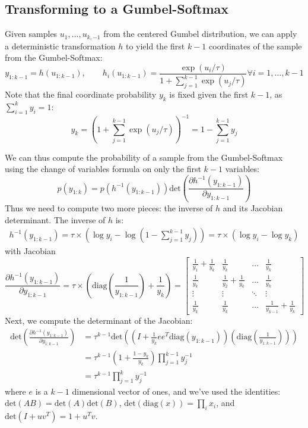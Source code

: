 \documentclass{article} %
\begin{document}
\subsection{Transforming to a Gumbel-Softmax}
Given samples $u_1, ..., u_{k, -1}$ from the centered Gumbel distribution, we can apply a deterministic transformation $h$ to yield the first $k-1$ coordinates of the sample from the Gumbel-Softmax:
\begin{equation}
y_{1:k-1} = h(u_{1:k-1}), \qquad h_i(u_{1:k-1}) = \frac{\exp(u_i / \tau)}{1 + \sum_{j=1}^{k-1} \exp(u_j / \tau)} \forall i=1,\dots,{k-1}
\end{equation}
Note that the final coordinate probability $y_k$ is fixed given the first $k-1$, as $\sum_{i=1}^k y_i=1$:
\begin{equation}
y_k = \left(1 + {\sum_{j=1}^{k-1} \exp(u_j / \tau)}\right)^{-1} = 1 - \sum_{j=1}^{k-1} y_j
\end{equation}

We can thus compute the probability of a sample from the Gumbel-Softmax using the change of variables formula on only the first $k-1$ variables:
\begin{equation}\label{eq:change_of_var}
p(y_{1:k}) = p\left(h^{-1}(y_{1:k-1}) \right)\text{det}\left(\frac{\partial h^{-1}(y_{1:k-1}) }{\partial y_{1:k-1}}\right)
\end{equation}
Thus we need to compute two more pieces: the inverse of $h$ and its Jacobian determinant.
The inverse of $h$ is:
\begin{align}\label{eq:h_inv}
h^{-1}(y_{1:k-1})= \tau\times \left(\log y_i - \log\left(1 - \sum_{j=1}^{k-1}y_j\right)\right) = \tau \times \left(\log y_i - \log y_k \right)
\end{align}
with Jacobian
\begin{equation}
\frac{\partial h^{-1}(y_{1:k-1}) }{\partial y_{1:k-1}} = \tau \times \left(\text{diag}\left(\frac{1}{y_{1:k-1}}\right)  + \frac{1}{y_k}\right)=
\begin{bmatrix}
\frac{1}{y_1} + \frac{1}{y_k} & \frac{1}{y_k}&\dots & \frac{1}{y_k}\\
\frac{1}{y_k} & \frac{1}{y_2} + \frac{1}{y_k} &\dots &  \frac{1}{y_k}\\
\vdots & \vdots & \ddots & \vdots\\
\frac{1}{y_k} & \frac{1}{y_k} &\dots & \frac{1}{y_{k-1}} + \frac{1}{y_k}
\end{bmatrix}
\end{equation}
Next, we compute the determinant of the Jacobian:
\begin{align}
\text{det}\left(\frac{\partial h^{-1}(y_{1:k-1}) }{\partial y_{1:k-1}} \right) &= \tau^{k-1}\text{det}\left(\left(I + \frac{1}{y_k}ee^T\text{diag}\left(y_{1:k-1}\right)\right) \left(\text{diag}\left(\frac{1}{y_{1:k-1}}\right)\right)\right)\\
&= \tau^{k-1}\left(1 + \frac{1-y_k}{y_k}\right)\prod_{j=1}^{k-1} y_j^{-1}\\
&= \tau^{k-1}\prod_{j=1}^{k} y_j^{-1}
\label{eq:h_jac}
\end{align}
where $e$ is a $k-1$ dimensional vector of ones, and we've used the identities: $\text{det}(AB)=\text{det}(A)\text{det}(B)$, $\text{det}(\text{diag}(x))=\prod_i x_i$, and $\text{det}(I+uv^T)=1+u^Tv$.
\end{document}
